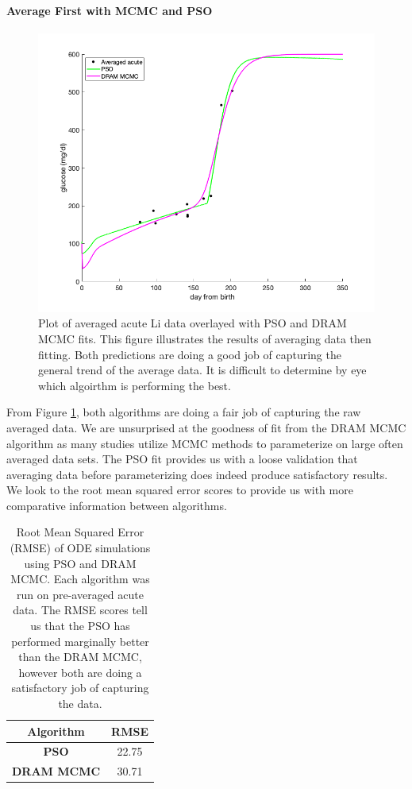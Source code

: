 \paragraph{Average First with MCMC and PSO}
\begin{figure}[H]
    \centering
    \includegraphics[width=15cm]{Comparison_Figures/averagethenfit_pso_dram_comp.png}
    \caption{Plot of averaged acute Li data overlayed with PSO and DRAM MCMC fits. This figure illustrates the results of averaging data then fitting. Both predictions are doing a good job of capturing the general trend of the average data. It is difficult to determine by eye which algoirthm is performing the best.}
    \label{fig:Results_Averaged_PSOMCMC_Fit}
\end{figure}
From Figure \ref{fig:Results_Averaged_PSOMCMC_Fit}, both algorithms are doing a fair job of capturing the raw averaged data. We are unsurprised at the goodness of fit from the DRAM MCMC algorithm as many studies utilize MCMC methods to parameterize on large often averaged data sets. The PSO fit provides us with a loose validation that averaging data before parameterizing does indeed produce satisfactory results. We look to the root mean squared error scores to provide us with more comparative information between algorithms.
\begin{table}[H]
  \begin{center}
    \begin{tabular}{c|c} %
      \textbf{Algorithm} & \textbf{RMSE} \\
      \hline
      \textbf{PSO} & 22.75\\
      \textbf{DRAM MCMC} & 30.71\\
    \end{tabular}
    \caption{Root Mean Squared Error (RMSE) of ODE simulations using PSO and DRAM MCMC. Each algorithm was run on pre-averaged acute data. The RMSE scores tell us that the PSO has performed marginally better than the DRAM MCMC, however both are doing a satisfactory job of capturing the data.}
  \end{center}
  \label{tab:mcmcpsoT1D}
\end{table}
